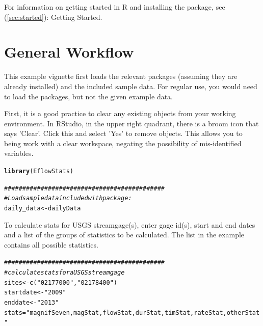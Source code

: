 \documentclass[a4paper,11pt]{article}\usepackage[]{graphicx}\usepackage[]{color}
\makeatletter
\newcommand{\hlstr}[1]{\textcolor[rgb]{0.192,0.494,0.8}{#1}}%
\newcommand{\hlcom}[1]{\textcolor[rgb]{0.678,0.584,0.686}{\textit{#1}}}%
\newcommand{\hlstd}[1]{\textcolor[rgb]{0.345,0.345,0.345}{#1}}%
\newcommand{\hlkwb}[1]{\textcolor[rgb]{0.69,0.353,0.396}{#1}}%
\newcommand{\hlkwd}[1]{\textcolor[rgb]{0.737,0.353,0.396}{\textbf{#1}}}%
\newenvironment{kframe}{%
 \def\at@end@of@kframe{}%
 \ifinner\ifhmode%
  \def\at@end@of@kframe{\end{minipage}}%
  \begin{minipage}{\columnwidth}%
 \fi\fi%
 \def\FrameCommand##1{\hskip\@totalleftmargin \hskip-\fboxsep
 \colorbox{shadecolor}{##1}\hskip-\fboxsep
     \hskip-\linewidth \hskip-\@totalleftmargin \hskip\columnwidth}%
 \MakeFramed {\advance\hsize-\width
   \@totalleftmargin\z@ \linewidth\hsize
   \@setminipage}}%
 {\par\unskip\endMakeFramed%
 \at@end@of@kframe}
\newenvironment{knitrout}{}{} %
\makeatother
\begin{document}
For information on getting started in R and installing the package, see (\ref{sec:started}): Getting Started.

\section{General Workflow}
\label{sec:exampleWorkflow}

This example vignette first loads the relevant packages (assuming they are already installed) and the included sample data. For regular use, you would need to load the packages, but not the given example data.

First, it is a good practice to clear any existing objects from your working environment. In RStudio, in the upper right quadrant, there is a broom icon that says 'Clear'. Click this and select 'Yes' to remove objects. This allows you to being work with a clear workspace, negating the possibility of mis-identified variables. 

\begin{knitrout}
\color{fgcolor}\begin{kframe}
\begin{alltt}
\hlkwd{library}\hlstd{(EflowStats)}

\hlcom{############################################}
\hlcom{# Load sample data included with package:}
\hlstd{daily_data}\hlkwb{<-}\hlstd{dailyData}
\end{alltt}
\end{kframe}
\end{knitrout}


To calculate stats for USGS streamgage(s), enter gage id(s), start and end dates and a list of the groups of statistics to be calculated. The list in the example contains all possible statistics.

\begin{knitrout}
\color{fgcolor}\begin{kframe}
\begin{alltt}
\hlcom{############################################}
\hlcom{# calculate stats for a USGS streamgage}
\hlstd{sites} \hlkwb{<-} \hlkwd{c}\hlstd{(}\hlstr{"02177000"}\hlstd{,}\hlstr{"02178400"}\hlstd{)}
\hlstd{startdate} \hlkwb{<-} \hlstr{"2009"}
\hlstd{enddate} \hlkwb{<-} \hlstr{"2013"}
\hlstd{stats}\hlkwb{=}\hlstr{"magnifSeven,magStat,flowStat,durStat,timStat,rateStat,otherStat"}
\end{alltt}
\end{kframe}
\end{knitrout}
\end{document}
